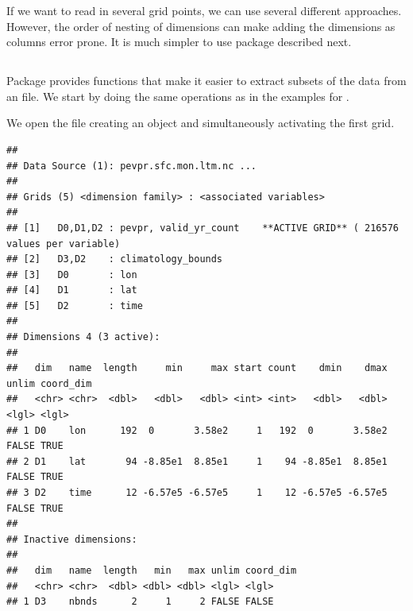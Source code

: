 \documentclass[krantz2]{krantz}\usepackage{knitr}
\begin{document}
If we want to read in several grid points, we can use several different approaches. However, the order of nesting of dimensions can make adding the dimensions as columns error prone. It is much simpler to use package  described next.

\subsection[tidync]{}



Package  provides functions that make it easier to extract subsets of the data from an  file. We start by doing the same operations as in the examples for .

We open the file creating an object and simultaneously activating the first grid.

\begin{knitrout}\footnotesize
{}\color{fgcolor}\begin{kframe}
\begin{alltt}
 \hlkwb{<-} \hlstd{(}\hlstd{)}
\end{alltt}
\begin{verbatim}
## 
## Data Source (1): pevpr.sfc.mon.ltm.nc ...
## 
## Grids (5) <dimension family> : <associated variables> 
## 
## [1]   D0,D1,D2 : pevpr, valid_yr_count    **ACTIVE GRID** ( 216576  values per variable)
## [2]   D3,D2    : climatology_bounds
## [3]   D0       : lon
## [4]   D1       : lat
## [5]   D2       : time
## 
## Dimensions 4 (3 active): 
##   
##   dim   name  length     min     max start count    dmin    dmax unlim coord_dim 
##   <chr> <chr>  <dbl>   <dbl>   <dbl> <int> <int>   <dbl>   <dbl> <lgl> <lgl>     
## 1 D0    lon      192  0       3.58e2     1   192  0       3.58e2 FALSE TRUE      
## 2 D1    lat       94 -8.85e1  8.85e1     1    94 -8.85e1  8.85e1 FALSE TRUE      
## 3 D2    time      12 -6.57e5 -6.57e5     1    12 -6.57e5 -6.57e5 FALSE TRUE      
##   
## Inactive dimensions:
##   
##   dim   name  length   min   max unlim coord_dim 
##   <chr> <chr>  <dbl> <dbl> <dbl> <lgl> <lgl>     
## 1 D3    nbnds      2     1     2 FALSE FALSE
\end{verbatim}
\end{kframe}
\end{knitrout}
\end{document}
